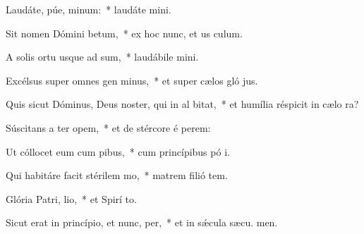 \item Laudáte, púe, minum:~* laudáte  mini.
\item Sit nomen Dómini betum,~* ex hoc nunc, et us  culum.
\item A solis ortu usque ad sum,~* laudábile  mini.
\item Excélsus super omnes gen minus,~* et super cælos gló jus.
\item Quis sicut Dóminus, Deus noster, qui in al bitat,~* et humília réspicit in cælo   ra?
\item Súscitans a ter opem,~* et de stércore é perem:
\item Ut cóllocet eum cum pibus,~* cum princípibus pó i.
\item Qui habitáre facit stérilem  mo,~* matrem filió tem.
\item Glória Patri,  lio,~* et Spirí to.
\item Sicut erat in princípio, et nunc,  per,~* et in sǽcula sæcu. men.
